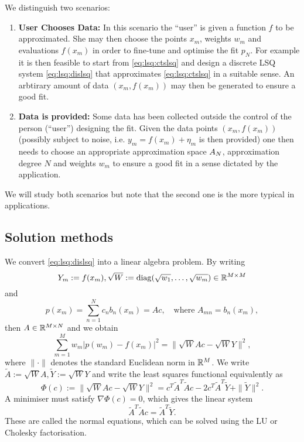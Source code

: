 We distinguish two scenarios:
\begin{enumerate}
\item {\bf User Chooses Data: } In this scenario the ``user'' is given a
function $f$ to be approximated. She may then choose the points $x_m$, weights
$w_m$ and evaluations $f(x_m)$ in order to fine-tune and optimise the fit $p_N$.
For example it is then feasible to start from \eqref{eq:lsq:ctslsq} and design a
discrete LSQ system \eqref{eq:lsq:dislsq} that approximates
\eqref{eq:lsq:ctslsq} in a suitable sense. An arbtirary amount of data $(x_m,
f(x_m))$ may then be generated to ensure a good fit.

\item {\bf Data is provided: } Some data has been collected outside the control
of the person (``user'') designing the fit. Given the data points $(x_m, f(x_m))$
(possibly subject to noise, i.e. $y_m = f(x_m) + \eta_m$ is then provided)
one then needs to choose an appropriate approximation space $\AA_N$,
approximation degree $N$ and weights $w_m$ to ensure a good fit in a sense
dictated by the application.
\end{enumerate}

We will study both scenarios but note that the second one is the more
typical in applications.

\subsection{Solution methods}
%
\label{sec:lsq:soln}
%
We convert \eqref{eq:lsq:dislsq} into a linear algebra problem.
By writing
\[
    Y_m := f(x_m),  \sqrt{W} := {\rm diag}(\sqrt{w_1}, \dots, \sqrt{w_m}) \in \R^{M \times M}
\]
and
\[
    p(x_m) = \sum_{n = 1}^N c_n b_n(x_m) = A c,
    \quad \text{where }  A_{mn} = b_n(x_m),
\]
then $A \in \R^{M \times N}$ and we obtain
\[
    \sum_{m = 1}^M w_m | p(w_m) - f(x_m)|^2
    = \big\| \sqrt{W} A c - \sqrt{W} Y \big\|^2,
\]
where $\|\cdot\|$ denotes the standard Euclidean norm in $\R^M$.
We write $\tilde{A} := \sqrt{W} A, \tilde{Y} := \sqrt{W} Y$ and
write the least squares functional equivalently as
\[
    \Phi(c) := \big\| \sqrt{W} A c - \sqrt{W} Y \big\|^2
    = c^T \tilde{A}^T \tilde{A} c - 2 c^T \tilde{A}^T \tilde{Y} + \|\tilde{Y}\|^2.
\]
A minimiser must satisfy $\nabla\Phi(c) = 0$, which gives the linear system
\begin{equation} \label{eq:lsq:normaleqns}
    \tilde{A}^T\tilde{A} c = \tilde{A}^T \tilde{Y}.
\end{equation}
These are called the normal equations, which can be solved using
the LU or Cholesky factorisation.


